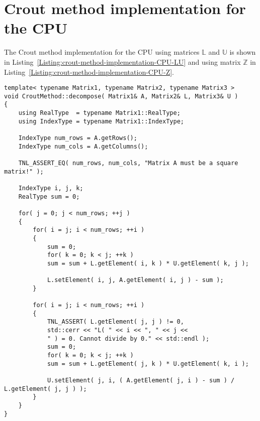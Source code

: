 \chapter{Crout method implementation for the CPU}\label{Attachment:crout-method-implementation-CPU}
The Crout method implementation for the CPU using matrices $ \mathbb{L} $ and $ \mathbb{U} $ is shown in Listing~\ref{Listing:crout-method-implementation-CPU-LU} and using matrix $ \mathbb{Z} $ in Listing~\ref{Listing:crout-method-implementation-CPU-Z}.
\begin{lstlisting}[language={},caption={Implementation of the Crout method on the CPU using matrices $ \mathbb{L} $ and $ \mathbb{U} $. All matrix and variable types are obtained from template arguments of the method. Taken from the Decomposition project repository on GitLab\protect\footref{Footnote:decomposition-project-gitlab-url}.},label={Listing:crout-method-implementation-CPU-LU}]
template< typename Matrix1, typename Matrix2, typename Matrix3 >
void CroutMethod::decompose( Matrix1& A, Matrix2& L, Matrix3& U )
{
	using RealType  = typename Matrix1::RealType;
	using IndexType = typename Matrix1::IndexType;
	
	IndexType num_rows = A.getRows();
	IndexType num_cols = A.getColumns();
	
	TNL_ASSERT_EQ( num_rows, num_cols, "Matrix A must be a square matrix!" );
	
	IndexType i, j, k;
	RealType sum = 0;
	
	for( j = 0; j < num_rows; ++j )
	{
		for( i = j; i < num_rows; ++i )
		{
			sum = 0;
			for( k = 0; k < j; ++k )
			sum = sum + L.getElement( i, k ) * U.getElement( k, j );
			
			L.setElement( i, j, A.getElement( i, j ) - sum );
		}
		
		for( i = j; i < num_rows; ++i )
		{
			TNL_ASSERT( L.getElement( j, j ) != 0,
			std::cerr << "L( " << i << ", " << j <<
			" ) = 0. Cannot divide by 0." << std::endl );
			sum = 0;
			for( k = 0; k < j; ++k )
			sum = sum + L.getElement( j, k ) * U.getElement( k, i );
			
			U.setElement( j, i, ( A.getElement( j, i ) - sum ) / L.getElement( j, j ) );
		}
	}	
}
\end{lstlisting}

